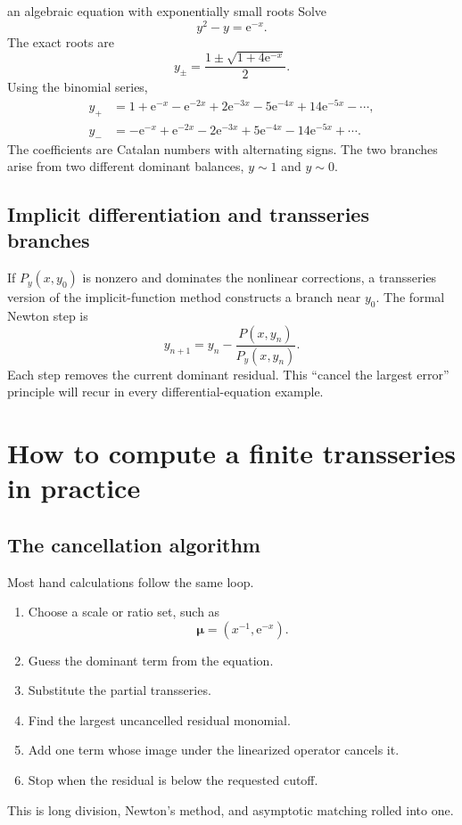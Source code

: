 \documentclass[11pt,openany]{book}
\theoremstyle{plain}
\theoremstyle{definition}
\theoremstyle{remark}
\newcommand{\e}{\mathrm{e}}
\begin{document}
\begin{workedbox}{an algebraic equation with exponentially small roots}
Solve
\[
  y^2-y=\e^{-x}.
\]
The exact roots are
\[
  y_{\pm}=\frac{1\pm\sqrt{1+4\e^{-x}}}{2}.
\]
Using the binomial series,
\begin{align*}
  y_+&=1+\e^{-x}-\e^{-2x}
      +2\e^{-3x}-5\e^{-4x}+14\e^{-5x}-\cdots,\\
  y_-&=-\e^{-x}+\e^{-2x}
      -2\e^{-3x}+5\e^{-4x}-14\e^{-5x}+\cdots.
\end{align*}
The coefficients are Catalan numbers with alternating signs. The two branches arise from two different dominant balances, $y\sim1$ and $y\sim0$.
\end{workedbox}

\section{Implicit differentiation and transseries branches}
If $P_y(x,y_0)$ is nonzero and dominates the nonlinear corrections, a transseries version of the implicit-function method constructs a branch near $y_0$. The formal Newton step is
\[
  y_{n+1}=y_n-\frac{P(x,y_n)}{P_y(x,y_n)}.
\]
Each step removes the current dominant residual. This ``cancel the largest error'' principle will recur in every differential-equation example.

\chapter{How to compute a finite transseries in practice}
\label{chap:algorithm}

\section{The cancellation algorithm}
Most hand calculations follow the same loop.
\begin{enumerate}
\item Choose a scale or ratio set, such as
\[
  \boldsymbol\mu=(x^{-1},\e^{-x}).
\]
\item Guess the dominant term from the equation.
\item Substitute the partial transseries.
\item Find the largest uncancelled residual monomial.
\item Add one term whose image under the linearized operator cancels it.
\item Stop when the residual is below the requested cutoff.
\end{enumerate}
This is long division, Newton's method, and asymptotic matching rolled into one.
\end{document}
